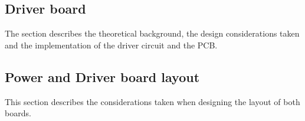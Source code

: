 \subsection{Driver board}
The section describes the theoretical background, the design considerations taken and the implementation of the driver circuit and the PCB.



\subsection{Power and Driver board layout}
This section describes the considerations taken when designing the layout of both boards.
